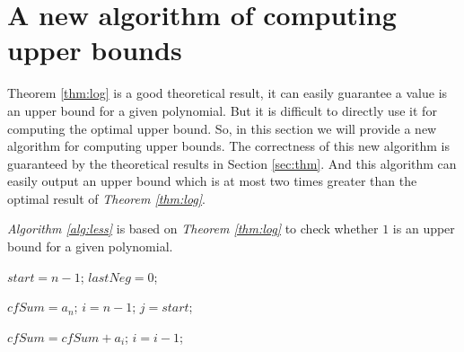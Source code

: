 
\section{A new algorithm of computing upper bounds}
\label{sec:alg}

Theorem \ref{thm:log} is a good theoretical result, it can easily guarantee  a value is an upper bound for a given polynomial. But it is difficult to directly use it for computing the optimal upper bound. So,  in this section we will provide a new algorithm for computing upper bounds. The correctness of this new algorithm is guaranteed by the theoretical results in Section \ref{sec:thm}. And this algorithm can easily output an upper bound which is at most two times greater than the optimal result of {\em Theorem \ref{thm:log}}.

{\em Algorithm \ref{alg:less}} is based on {\em Theorem \ref{thm:log}} to check whether $1$ is an upper bound for a given polynomial.


\begin{algorithm}
	\caption{\less \label{alg:less}}
	\DontPrintSemicolon
	
	$start=n-1$;
	$lastNeg=0$;\;
	
	
	$cfSum=a_n$;
	$i=n-1$;
	$j=start$;\;
	{
		{
			
			$cfSum=cfSum+a_i$;
			$i=i-1$;\;
			
		}
}

\end{algorithm}

